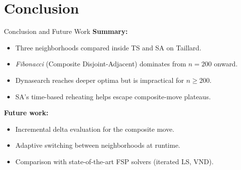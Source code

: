 \documentclass[aspectratio=169]{beamer}
\begin{document}
\section{Conclusion}
\begin{frame}{Conclusion and Future Work}
    \textbf{Summary:}
    \begin{itemize}
        \item Three neighborhoods compared inside TS and SA on Taillard.
        \item \emph{Fibonacci} (Composite Disjoint-Adjacent) dominates from $n = 200$ onward.
        \item Dynasearch reaches deeper optima but is impractical for $n \geq 200$.
        \item SA's time-based reheating helps escape composite-move plateaus.
    \end{itemize}

    \vspace{0.3cm}
    \textbf{Future work:}
    \begin{itemize}
        \item Incremental delta evaluation for the composite move.
        \item Adaptive switching between neighborhoods at runtime.
        \item Comparison with state-of-the-art FSP solvers (iterated LS, VND).
    \end{itemize}
\end{frame}
\end{document}
